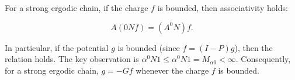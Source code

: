 For a strong ergodic chain, if the charge $f$ is bounded, then associativity holds:

$$A(0Nf) = (A^0N)f.$$

In particular, if the potential $g$ is bounded (since $f = (I - P)g$), then the relation holds. The key observation is $\alpha^0N1 \leq \alpha^0 N 1 = M_{\alpha 0} < \infty$. Consequently, for a strong ergodic chain, $g = -Gf$ whenever the charge $f$ is bounded.
